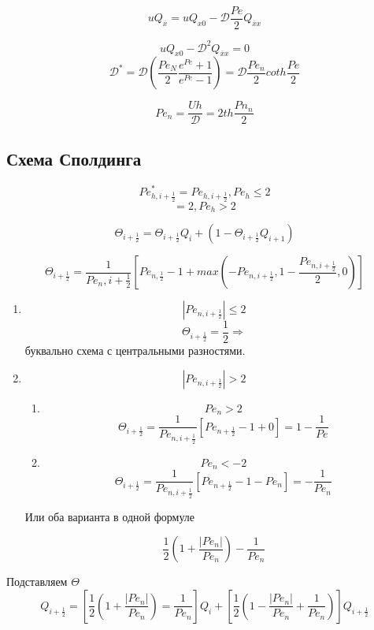 \documentclass[12pt, a4paper]{article}
\begin{document}
\[ u Q_{\overline{x}} = u Q_{x0} - \mathcal{D} \frac{Pe}{2} Q_{\overline{x}x} \]

\[ u Q_{x0} - \mathcal{D}^2 Q_{\overline{x}x} = 0 \]
\[ \mathcal{D}^* = \mathcal{D} (\frac{{Pe}_N}{2} \frac{e^{Pe} + 1}{e^{Pe}-1}) = \mathcal{D} \frac{{Pe}_n }{2} coth\frac{{Pe}}{2} \]

\[ {Pe}_n = \frac{Uh }{\mathcal{D }} = 2 th \frac{{Pn}_n}{2} \]

\subsection{Схема Сполдинга}

\[ {Pe}^*_{h, i+\frac{1}{2}} = Pe_{h, i+\frac{1}{2}}, {Pe}_h \leq 2 \]
\[ = 2, {Pe}_h > 2 \]

\[ \Theta_{i+\frac{1}{2}} = \Theta_{i+\frac{1}{2}} Q_i + (1 - \Theta_{i+\frac{1}{2}}Q_{i+1})\]

\[ \Theta_{i+\frac{1}{2}} = \frac{1}{{Pe_n, i+\frac{1}{2}}}[{Pe_{n, \frac{1}{2}}}-1+max(- {Pe}_{n, i+\frac{1}{2}}, 1-\frac{{Pe}_{n, i+\frac{1}{2}}}{2}, 0)] \]


\begin{enumerate}
	\item 
	\[ |Pe_{n, i+\frac{1}{2}}| \leq 2 \]
	\[ \Theta_{i+\frac{1}{2}} = \frac{1}{2} \Rightarrow \] буквально схема с центральными разностями.
	\item
	\[ |Pe_{n, i+\frac{1}{2}}| > 2 \]

	\begin{enumerate}
	\item 
	\[ {Pe}_n > 2 \]
	\[ \Theta_{i+\frac{1}{2}} = \frac{1}{{Pe}_{n, i+\frac{1}{2}}} [{Pe}_{n+\frac{1}{2}} -1 + 0] = 1 - \frac{1}{Pe} \]

	\item
	\[ Pe_{n} < -2 \]
	\[ \Theta_{i+\frac{1}{2}} = \frac{1}{{Pe}_{n, i+\frac{1}{2}}} [{Pe}_{n+\frac{1}{2}} -1 - {Pe}_n] = - \frac{1}{{Pe}_{n}} \]

	\end{enumerate}
	Или оба варианта в одной формуле

	\[ \frac{1}{2}(1+ \frac{|{Pe}_n|}{{Pe}_n}) - \frac{1}{{Pe}_n} \]

\end{enumerate}

Подставляем $ \Theta $
\[ Q_{i+\frac{1}{2}} = [ \frac{1}{2} (1 + \frac{|{Pe}_n|}{{Pe}_n}) = \frac{1}{{Pe}_n}] Q_i + [\frac{1}{2} (1 - \frac{|{Pe}_n|}{{Pe}_n} + \frac{1}{{Pe}_n })]Q_{i+\frac{1}{2}} \]
\end{document}
